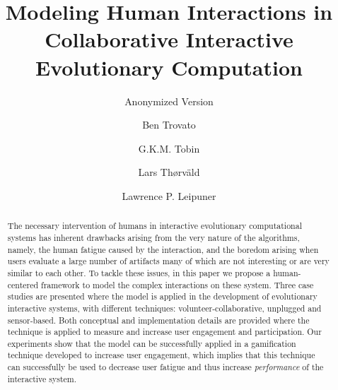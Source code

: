 \documentclass[sigconf]{acmart}
\begin{document}
\title{Modeling Human Interactions in Collaborative Interactive 
 Evolutionary Computation}
\subtitle{Anonymized Version}


\author{Ben Trovato}

\author{G.K.M. Tobin}

\author{Lars Th{\o}rv{\"a}ld}

\author{Lawrence P. Leipuner}



\begin{abstract}
The necessary intervention of humans in interactive evolutionary
computational systems has inherent drawbacks arising from the very nature of 
the algorithms, namely, the human fatigue caused by the interaction, and
the boredom arising when users evaluate a large number of artifacts 
many of which are not interesting or are very similar to each other.
To tackle these issues, in this paper we
propose a human-centered framework to model 
the complex interactions on these system.
Three case studies are presented where the model is applied in the 
development of evolutionary interactive systems, with different techniques:
volunteer-collaborative, unplugged and sensor-based. 
Both conceptual and implementation details are provided where the   
technique is applied to measure and increase user engagement and participation.
Our experiments show that the model can be successfully applied in a
gamification technique developed to increase user engagement, which
implies that this technique can successfully be used to 
decrease user fatigue and thus increase {\em performance} of the
interactive system.
\end{abstract}
\end{document}

